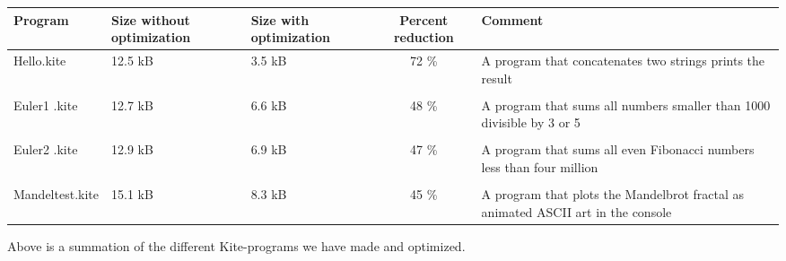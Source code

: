 \begin{center}
  \begin{tabulary}{0.9\textwidth}{|L| L |L| C | L | }
    \hline
    Program & Size without optimization & Size with optimization & Percent reduction & Comment \\
    \hline
    Hello.kite       & 12.5 kB & 3.5 kB & 72 \% & A program that concatenates two strings prints the result \\
    & & & & \\
    Euler1 .kite       & 12.7 kB & 6.6 kB & 48 \% & A program that sums all numbers smaller than 1000 divisible by 3 or 5 \\
    & & & & \\
    Euler2 .kite       & 12.9 kB & 6.9 kB & 47 \% & A program that sums all even Fibonacci numbers less than four million \\
    & & & & \\
    Mandeltest.kite       & 15.1 kB & 8.3 kB & 45 \% & A program that plots the Mandelbrot fractal as animated ASCII art in the console\\
    \hline
  \end{tabulary}  

Above is a summation of the different Kite-programs we have made and optimized.
\end{center}

